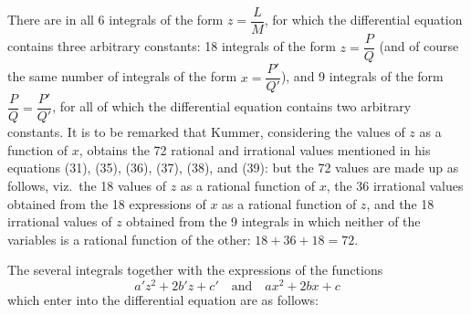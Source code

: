 \documentclass[11pt,a4paper]{book}
\begin{document}
There are in all 6 integrals of the form $z=\dfrac{L}{M}$, for which the differential equation contains three arbitrary constants: 18 integrals of the form $z=\dfrac{P}{Q}$ (and of course the same number of integrals of the form $x=\dfrac{P'}{Q'}$), and 9 integrals of the form $\dfrac{P}{Q}=\dfrac{P'}{Q'}$, for all of which the differential equation contains two arbitrary constants. It is to be remarked that Kummer, considering the values of $z$ as a function of $x$, obtains the 72 rational and irrational values mentioned in his equations (31), (35), (36), (37), (38), and (39): but the 72 values are made up as follows, viz.\ the 18 values of $z$ as a rational function of $x$, the 36 irrational values obtained from the 18 expressions of $x$ as a rational function of $z$, and the 18 irrational values of $z$ obtained from the 9 integrals in which neither of the variables is a rational function of the other: $18+36+18=72$.

\smallskip

The several integrals together with the expressions of the functions
\[
a'z^2+2b'z+c'\quad \text{and}\quad ax^2+2bx+c
\]
which enter into the differential equation are as follows:
\end{document}
